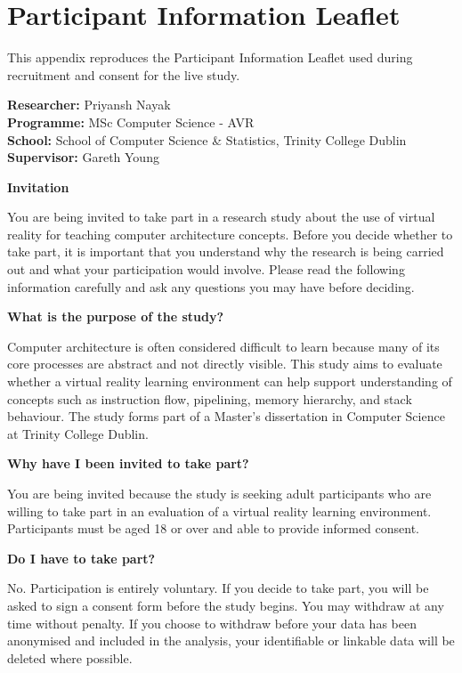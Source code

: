 \chapter{Participant Information Leaflet}
\label{app:pil}

\begingroup
\setlength{\parindent}{0pt}
\setlength{\parskip}{0.5em}

This appendix reproduces the Participant Information Leaflet used during recruitment and consent for the live study.

\textbf{Researcher:} Priyansh Nayak\\
\textbf{Programme:} MSc Computer Science - AVR\\
\textbf{School:} School of Computer Science \& Statistics, Trinity College Dublin\\
\textbf{Supervisor:} Gareth Young

\textbf{Invitation}

You are being invited to take part in a research study about the use of virtual reality for teaching computer architecture concepts. Before you decide whether to take part, it is important that you understand why the research is being carried out and what your participation would involve. Please read the following information carefully and ask any questions you may have before deciding.

\textbf{What is the purpose of the study?}

Computer architecture is often considered difficult to learn because many of its core processes are abstract and not directly visible. This study aims to evaluate whether a virtual reality learning environment can help support understanding of concepts such as instruction flow, pipelining, memory hierarchy, and stack behaviour. The study forms part of a Master's dissertation in Computer Science at Trinity College Dublin.

\textbf{Why have I been invited to take part?}

You are being invited because the study is seeking adult participants who are willing to take part in an evaluation of a virtual reality learning environment. Participants must be aged 18 or over and able to provide informed consent.

\textbf{Do I have to take part?}

No. Participation is entirely voluntary. If you decide to take part, you will be asked to sign a consent form before the study begins. You may withdraw at any time without penalty. If you choose to withdraw before your data has been anonymised and included in the analysis, your identifiable or linkable data will be deleted where possible.

